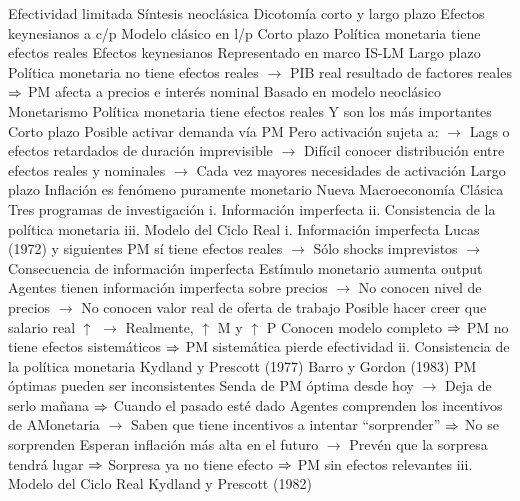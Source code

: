 \documentclass{nuevotema}
\begin{document}
\begin{esquemal}
				\4[$\then$] Efectividad limitada
			\3 Síntesis neoclásica
				\4 Dicotomía corto y largo plazo
				\4[] Efectos keynesianos a c/p
				\4[] Modelo clásico en l/p
				\4 Corto plazo
				\4[] Política monetaria tiene efectos reales
				\4[] Efectos keynesianos
				\4[] Representado en marco IS-LM
				\4[] 
				\4 Largo plazo
				\4[] Política monetaria no tiene efectos reales
				\4[] $\to$ PIB real resultado de factores reales
				\4[] $\then$ PM afecta a precios e interés nominal
				\4[] Basado en modelo neoclásico
				\4[] 
			\3 Monetarismo
				\4 Política monetaria tiene efectos reales
				\4[] Y son los más importantes
				\4 Corto plazo
				\4[] Posible activar demanda vía PM
				\4[] Pero activación sujeta a:
				\4[] $\to$ Lags o efectos retardados de duración imprevisible
				\4[] $\to$ Difícil conocer distribución entre efectos reales y nominales
				\4[] $\to$ Cada vez mayores necesidades de activación
				\4 Largo plazo
				\4[] Inflación es fenómeno puramente monetario
			\3 Nueva Macroeconomía Clásica
				\4 Tres programas de investigación
				\4[] i. Información imperfecta
				\4[] ii. Consistencia de la política monetaria
				\4[] iii. Modelo del Ciclo Real
				\4 i. Información imperfecta
				\4[] Lucas (1972) y siguientes
				\4[] PM sí tiene efectos reales
				\4[] $\to$ Sólo shocks imprevistos
				\4[] $\to$ Consecuencia de información imperfecta
				\4[] Estímulo monetario aumenta output
				\4[] Agentes tienen información imperfecta sobre precios
				\4[] $\to$ No conocen nivel de precios
				\4[] $\to$ No conocen valor real de oferta de trabajo
				\4[] Posible hacer creer que salario real $\uparrow$
				\4[] $\to$ Realmente, $\uparrow$ M y $\uparrow$ P
				\4[] Conocen modelo completo
				\4[] $\then$ PM no tiene efectos sistemáticos
				\4[] $\then$ PM sistemática pierde efectividad
				\4 ii. Consistencia de la política monetaria
				\4[] Kydland y Prescott (1977)
				\4[] Barro y Gordon (1983)
				\4[] PM óptimas pueden ser inconsistentes
				\4[] Senda de PM óptima desde hoy
				\4[] $\to$ Deja de serlo mañana
				\4[] $\then$ Cuando el pasado esté dado
				\4[] Agentes comprenden los incentivos de AMonetaria
				\4[] $\to$ Saben que tiene incentivos a intentar ``sorprender''
				\4[] $\then$ No se sorprenden
				\4[] Esperan inflación más alta en el futuro
				\4[] $\to$ Prevén que la sorpresa tendrá lugar
				\4[] $\then$ Sorpresa ya no tiene efecto
				\4[] $\then$ PM sin efectos relevantes
				\4 iii. Modelo del Ciclo Real
				\4[] Kydland y Prescott (1982)

\end{esquemal}
\end{document}
